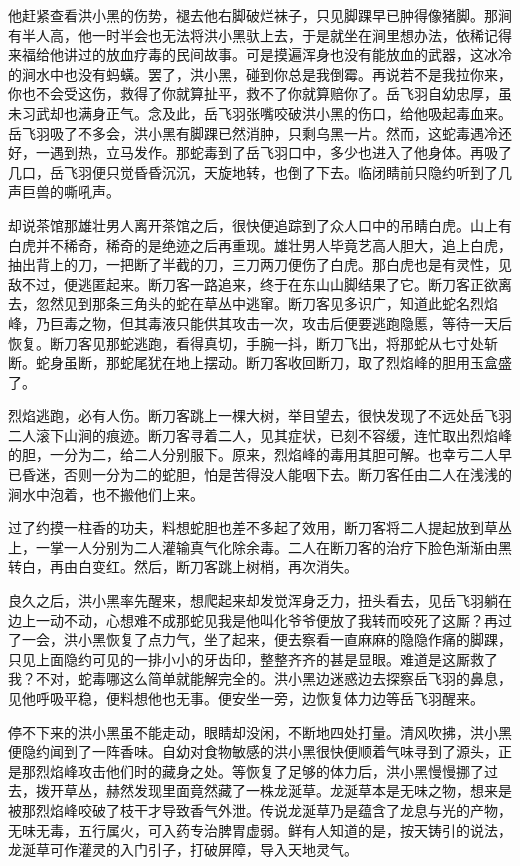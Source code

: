 他赶紧查看洪小黑的伤势，褪去他右脚破烂袜子，只见脚踝早已肿得像猪脚。那涧有半人高，他一时半会也无法将洪小黑驮上去，于是就坐在涧里想办法，依稀记得来福给他讲过的放血疗毒的民间故事。可是摸遍浑身也没有能放血的武器，这冰冷的涧水中也没有蚂蟥。罢了，洪小黑，碰到你总是我倒霉。再说若不是我拉你来，你也不会受这伤，救得了你就算扯平，救不了你就算赔你了。岳飞羽自幼忠厚，虽未习武却也满身正气。念及此，岳飞羽张嘴咬破洪小黑的伤口，给他吸起毒血来。岳飞羽吸了不多会，洪小黑有脚踝已然消肿，只剩乌黑一片。然而，这蛇毒遇冷还好，一遇到热，立马发作。那蛇毒到了岳飞羽口中，多少也进入了他身体。再吸了几口，岳飞羽便只觉昏昏沉沉，天旋地转，也倒了下去。临闭睛前只隐约听到了几声巨兽的嘶吼声。

却说茶馆那雄壮男人离开茶馆之后，很快便追踪到了众人口中的吊睛白虎。山上有白虎并不稀奇，稀奇的是绝迹之后再重现。雄壮男人毕竟艺高人胆大，追上白虎，抽出背上的刀，一把断了半截的刀，三刀两刀便伤了白虎。那白虎也是有灵性，见敌不过，便逃匿起来。断刀客一路追来，终于在东山山脚结果了它。断刀客正欲离去，忽然见到那条三角头的蛇在草丛中逃窜。断刀客见多识广，知道此蛇名烈焰峰，乃巨毒之物，但其毒液只能供其攻击一次，攻击后便要逃跑隐慝，等待一天后恢复。断刀客见那蛇逃跑，看得真切，手腕一抖，断刀飞出，将那蛇从七寸处斩断。蛇身虽断，那蛇尾犹在地上摆动。断刀客收回断刀，取了烈焰峰的胆用玉盒盛了。

烈焰逃跑，必有人伤。断刀客跳上一棵大树，举目望去，很快发现了不远处岳飞羽二人滚下山涧的痕迹。断刀客寻着二人，见其症状，已刻不容缓，连忙取出烈焰峰的胆，一分为二，给二人分别服下。原来，烈焰峰的毒用其胆可解。也幸亏二人早已昏迷，否则一分为二的蛇胆，怕是苦得没人能咽下去。断刀客任由二人在浅浅的涧水中泡着，也不搬他们上来。

过了约摸一柱香的功夫，料想蛇胆也差不多起了效用，断刀客将二人提起放到草丛上，一掌一人分别为二人灌输真气化除余毒。二人在断刀客的治疗下脸色渐渐由黑转白，再由白变红。然后，断刀客跳上树梢，再次消失。

良久之后，洪小黑率先醒来，想爬起来却发觉浑身乏力，扭头看去，见岳飞羽躺在边上一动不动，心想难不成那蛇见我是他叫化爷爷便放了我转而咬死了这厮？再过了一会，洪小黑恢复了点力气，坐了起来，便去察看一直麻麻的隐隐作痛的脚踝，只见上面隐约可见的一排小小的牙齿印，整整齐齐的甚是显眼。难道是这厮救了我？不对，蛇毒哪这么简单就能解完全的。洪小黑边迷惑边去探察岳飞羽的鼻息，见他呼吸平稳，便料想他也无事。便安坐一旁，边恢复体力边等岳飞羽醒来。

停不下来的洪小黑虽不能走动，眼睛却没闲，不断地四处打量。清风吹拂，洪小黑便隐约闻到了一阵香味。自幼对食物敏感的洪小黑很快便顺着气味寻到了源头，正是那烈焰峰攻击他们时的藏身之处。等恢复了足够的体力后，洪小黑慢慢挪了过去，拨开草丛，赫然发现里面竟然藏了一株龙涎草。龙涎草本是无味之物，想来是被那烈焰峰咬破了枝干才导致香气外泄。传说龙涎草乃是蕴含了龙息与光的产物，无味无毒，五行属火，可入药专治脾胃虚弱。鲜有人知道的是，按天铸引的说法，龙涎草可作灌灵的入门引子，打破屏障，导入天地灵气。

